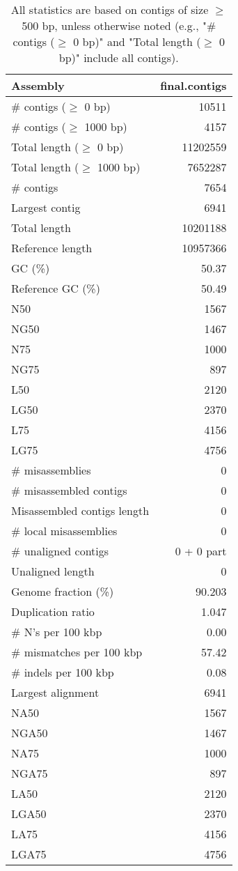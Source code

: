 \documentclass[12pt,a4paper]{article}
\begin{document}
\begin{table}[ht]
\begin{center}
\caption{All statistics are based on contigs of size $\geq$ 500 bp, unless otherwise noted (e.g., "\# contigs ($\geq$ 0 bp)" and "Total length ($\geq$ 0 bp)" include all contigs).}
\begin{tabular}{|l*{1}{|r}|}
\hline
Assembly & final.contigs \\ \hline
\# contigs ($\geq$ 0 bp) & 10511 \\ \hline
\# contigs ($\geq$ 1000 bp) & 4157 \\ \hline
Total length ($\geq$ 0 bp) & 11202559 \\ \hline
Total length ($\geq$ 1000 bp) & 7652287 \\ \hline
\# contigs & 7654 \\ \hline
Largest contig & 6941 \\ \hline
Total length & 10201188 \\ \hline
Reference length & 10957366 \\ \hline
GC (\%) & 50.37 \\ \hline
Reference GC (\%) & 50.49 \\ \hline
N50 & 1567 \\ \hline
NG50 & 1467 \\ \hline
N75 & 1000 \\ \hline
NG75 & 897 \\ \hline
L50 & 2120 \\ \hline
LG50 & 2370 \\ \hline
L75 & 4156 \\ \hline
LG75 & 4756 \\ \hline
\# misassemblies & 0 \\ \hline
\# misassembled contigs & 0 \\ \hline
Misassembled contigs length & 0 \\ \hline
\# local misassemblies & 0 \\ \hline
\# unaligned contigs & 0 + 0 part \\ \hline
Unaligned length & 0 \\ \hline
Genome fraction (\%) & 90.203 \\ \hline
Duplication ratio & 1.047 \\ \hline
\# N's per 100 kbp & 0.00 \\ \hline
\# mismatches per 100 kbp & 57.42 \\ \hline
\# indels per 100 kbp & 0.08 \\ \hline
Largest alignment & 6941 \\ \hline
NA50 & 1567 \\ \hline
NGA50 & 1467 \\ \hline
NA75 & 1000 \\ \hline
NGA75 & 897 \\ \hline
LA50 & 2120 \\ \hline
LGA50 & 2370 \\ \hline
LA75 & 4156 \\ \hline
LGA75 & 4756 \\ \hline
\end{tabular}
\end{center}
\end{table}
\end{document}
